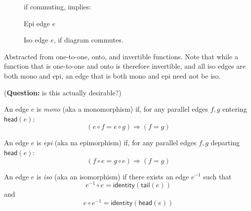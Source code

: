 \documentclass[11pt,openany]{article}
\begin{document}
\begin{figure}
\centering
{}
if commuting, implies:
\caption{Epi edge $e$}
\label{fig:epi}
\end{figure}

\begin{figure}
\centering
{}
\caption{Iso edge $e$, if diagram commutes.}
\label{fig:iso}
\end{figure}

Abstracted from one-to-one, onto, and invertible functions.
Note that while a function that is one-to-one and onto is
therefore invertible, and all iso edges are both mono and epi,
an edge that is both mono and epi need not be iso.

(\textbf{Question:} is this actually desirable?)


An edge $e$ is \textit{mono} (aka a monomorphism)
if, for any parallel edges $f,g$ entering $\mathsf{head}(e)$:
\[
\left( e \circ f = e \circ g \right) \Rightarrow (f = g)
\]

An edge $e$ is \textit{epi} (aka na epimorphism)
if, for any parallel edges $f,g$ departing $\mathsf{head}(e)$:
\[
\left( f \circ e = g \circ e \right) \Rightarrow (f = g)
\]

An edge $e$ is \textit{iso} (aka an isomorphism)
if there exists an edge $e^{-1}$ such that
\[
e^{-1} \circ e = \mathsf{identity}(\mathsf{tail}(e))
\]
and
\[
e \circ e^{-1} = \mathsf{identity}(\mathsf{head}(e))
\]


\setcounter{currentlevel}{\value{baseSectionLevel}}
\label{sec:Topos-down}
 
\end{document}
